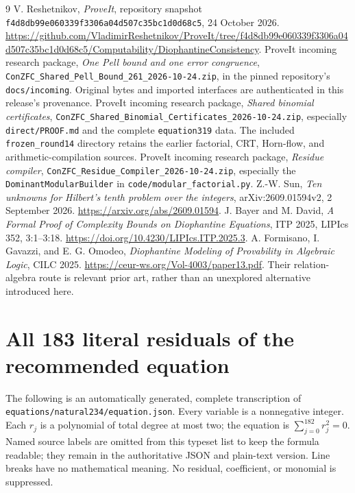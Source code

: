 \documentclass[11pt,a4paper]{article}
\theoremstyle{remark}
\newcommand{\qref}[1]{\nolinkurl{#1}}
\begin{document}
\begin{thebibliography}{9}
 V. Reshetnikov, \emph{ProveIt}, repository snapshot
\qref{f4d8db99e060339f3306a04d507c35bc1d0d68c5}, 24 October 2026.
\url{https://github.com/VladimirReshetnikov/ProveIt/tree/f4d8db99e060339f3306a04d507c35bc1d0d68c5/Computability/DiophantineConsistency}.
 ProveIt incoming research package,
\emph{One Pell bound and one error congruence},
\qref{ConZFC_Shared_Pell_Bound_261_2026-10-24.zip}, in the pinned
repository's \qref{docs/incoming}. Original bytes and imported interfaces
are authenticated in this release's provenance.
 ProveIt incoming research package,
\emph{Shared binomial certificates},
\qref{ConZFC_Shared_Binomial_Certificates_2026-10-24.zip}, especially
\qref{direct/PROOF.md} and the complete \qref{equation319} data.
The included \qref{frozen_round14} directory retains the earlier factorial,
CRT, Horn-flow, and arithmetic-compilation sources.
 ProveIt incoming research package,
\emph{Residue compiler},
\qref{ConZFC_Residue_Compiler_2026-10-24.zip}, especially the
\qref{DominantModularBuilder} in \qref{code/modular_factorial.py}.
 Z.-W. Sun, \emph{Ten unknowns for Hilbert's tenth problem
over the integers}, arXiv:2609.01594v2, 2 September 2026.
\url{https://arxiv.org/abs/2609.01594}.
 J. Bayer and M. David,
\emph{A Formal Proof of Complexity Bounds on Diophantine Equations},
ITP 2025, LIPIcs 352, 3:1--3:18.
\url{https://doi.org/10.4230/LIPIcs.ITP.2025.3}.
 A. Formisano, I. Gavazzi, and E. G. Omodeo,
\emph{Diophantine Modeling of Provability in Algebraic Logic}, CILC 2025.
\url{https://ceur-ws.org/Vol-4003/paper13.pdf}.
Their relation-algebra route is relevant prior art, rather than an
unexplored alternative introduced here.
\end{thebibliography}

\clearpage
\appendix
\section{All 183 literal residuals of the recommended equation}\label{app:residuals}

The following is an automatically generated, complete transcription of
\qref{equations/natural234/equation.json}. Every variable is a nonnegative
integer. Each \(r_j\) is a polynomial of total degree at most two; the
equation is \(\sum_{j=0}^{182}r_j^2=0\). Named source labels are omitted
from this typeset list to keep the formula readable; they remain in the
authoritative JSON and plain-text version. Line breaks have no mathematical
meaning. No residual, coefficient, or monomial is suppressed.


\end{document}
